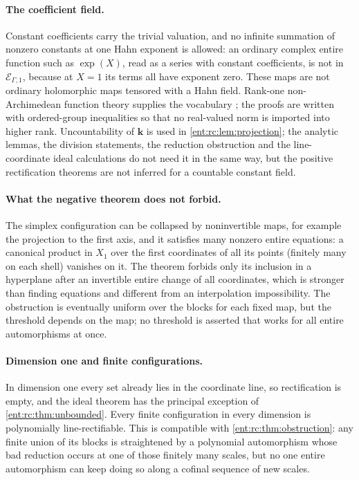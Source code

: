 \documentclass[11pt]{article}
\theoremstyle{plain}
\theoremstyle{plain}
\theoremstyle{plain}
\theoremstyle{definition}
\theoremstyle{definition}
\theoremstyle{definition}
\theoremstyle{definition}
\theoremstyle{remark}
\newcommand{\kk}{\mathbf k}\newcommand{\PP}{\mathbb P}
\begin{document}
\paragraph{The coefficient field.}
Constant coefficients carry the trivial valuation, and no infinite summation
of nonzero constants at one Hahn exponent is allowed: an ordinary complex
entire function such as $\exp(X)$, read as a series with constant coefficients,
is not in $\mathcal E_{\Gamma,1}$, because at $X=1$ its terms all have
exponent zero. These maps are not ordinary holomorphic maps tensored with a
Hahn field. Rank-one non-Archimedean function theory supplies the vocabulary
\cite{CherryLectures}; the proofs are written with ordered-group inequalities
so that no real-valued norm is imported into higher rank. Uncountability of
$\kk$ is used in \cref{ent:rc:lem:projection}; the analytic lemmas, the
division statements, the reduction obstruction and the line-coordinate ideal
calculations do not need it in the same way, but the positive rectification
theorems are not inferred for a countable constant field.

\paragraph{What the negative theorem does not forbid.}
The simplex configuration can be collapsed by noninvertible maps, for example
the projection to the first axis, and it satisfies many nonzero entire
equations: a canonical product in $X_1$ over the first coordinates of all its
points (finitely many on each shell) vanishes on it. The theorem forbids only
its inclusion in a hyperplane after an invertible entire change of all
coordinates, which is stronger than finding equations and different from an
interpolation impossibility. The obstruction is eventually uniform over the
blocks for each fixed map, but the threshold depends on the map; no threshold
is asserted that works for all entire automorphisms at once.

\paragraph{Dimension one and finite configurations.}
In dimension one every set already lies in the coordinate line, so
rectification is empty, and the ideal theorem has the principal exception of
\cref{ent:rc:thm:unbounded}. Every finite configuration in every dimension is
polynomially line-rectifiable. This is compatible with
\cref{ent:rc:thm:obstruction}: any finite union of its blocks is straightened
by a polynomial automorphism whose bad reduction occurs at one of those
finitely many scales, but no one entire automorphism can keep doing so along
a cofinal sequence of new scales.
\end{document}
